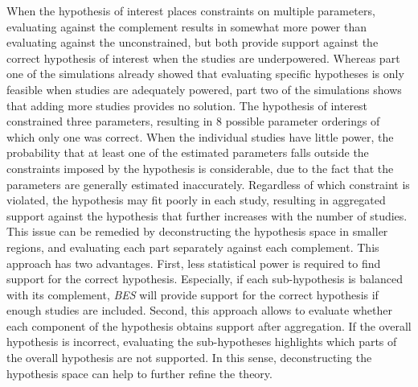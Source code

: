\documentclass[review, 3p, authoryear]{elsarticle} %
\begin{document}
When the hypothesis of interest places constraints on multiple parameters, evaluating against the complement results in somewhat more power than evaluating against the unconstrained, but both provide support against the correct hypothesis of interest when the studies are underpowered.
Whereas part one of the simulations already showed that evaluating specific hypotheses is only feasible when studies are adequately powered, part two of the simulations shows that adding more studies provides no solution.
The hypothesis of interest constrained three parameters, resulting in 8 possible parameter orderings of which only one was correct.
When the individual studies have little power, the probability that at least one of the estimated parameters falls outside the constraints imposed by the hypothesis is considerable, due to the fact that the parameters are generally estimated inaccurately.
Regardless of which constraint is violated, the hypothesis may fit poorly in each study, resulting in aggregated support against the hypothesis that further increases with the number of studies.
This issue can be remedied by deconstructing the hypothesis space in smaller regions, and evaluating each part separately against each complement.
This approach has two advantages.
First, less statistical power is required to find support for the correct hypothesis.
Especially, if each sub-hypothesis is balanced with its complement, \emph{BES} will provide support for the correct hypothesis if enough studies are included.
Second, this approach allows to evaluate whether each component of the hypothesis obtains support after aggregation.
If the overall hypothesis is incorrect, evaluating the sub-hypotheses highlights which parts of the overall hypothesis are not supported.
In this sense, deconstructing the hypothesis space can help to further refine the theory.
\end{document}
